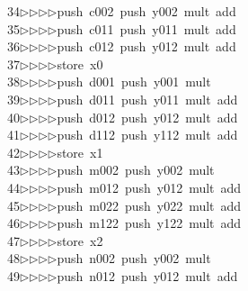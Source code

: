 \begin{tabbing}
34\>$\triangleright$\>$\triangleright$\>$\triangleright$\>$\triangleright$\>push\ c002\ push\ y002\ mult\ add\ \\[0pt]
35\>$\triangleright$\>$\triangleright$\>$\triangleright$\>$\triangleright$\>push\ c011\ push\ y011\ mult\ add\ \\[0pt]
36\>$\triangleright$\>$\triangleright$\>$\triangleright$\>$\triangleright$\>push\ c012\ push\ y012\ mult\ add\ \\[0pt]
37\>$\triangleright$\>$\triangleright$\>$\triangleright$\>$\triangleright$\>store\ x0\ \\[0pt]
38\>$\triangleright$\>$\triangleright$\>$\triangleright$\>$\triangleright$\>push\ d001\ push\ y001\ mult\ \\[0pt]
39\>$\triangleright$\>$\triangleright$\>$\triangleright$\>$\triangleright$\>push\ d011\ push\ y011\ mult\ add\ \\[0pt]
40\>$\triangleright$\>$\triangleright$\>$\triangleright$\>$\triangleright$\>push\ d012\ push\ y012\ mult\ add\ \\[0pt]
41\>$\triangleright$\>$\triangleright$\>$\triangleright$\>$\triangleright$\>push\ d112\ push\ y112\ mult\ add\ \\[0pt]
42\>$\triangleright$\>$\triangleright$\>$\triangleright$\>$\triangleright$\>store\ x1\ \\[0pt]
43\>$\triangleright$\>$\triangleright$\>$\triangleright$\>$\triangleright$\>push\ m002\ push\ y002\ mult\ \\[0pt]
44\>$\triangleright$\>$\triangleright$\>$\triangleright$\>$\triangleright$\>push\ m012\ push\ y012\ mult\ add\ \\[0pt]
45\>$\triangleright$\>$\triangleright$\>$\triangleright$\>$\triangleright$\>push\ m022\ push\ y022\ mult\ add\ \\[0pt]
46\>$\triangleright$\>$\triangleright$\>$\triangleright$\>$\triangleright$\>push\ m122\ push\ y122\ mult\ add\ \\[0pt]
47\>$\triangleright$\>$\triangleright$\>$\triangleright$\>$\triangleright$\>store\ x2\ \\[0pt]
48\>$\triangleright$\>$\triangleright$\>$\triangleright$\>$\triangleright$\>push\ n002\ push\ y002\ mult\ \\[0pt]
49\>$\triangleright$\>$\triangleright$\>$\triangleright$\>$\triangleright$\>push\ n012\ push\ y012\ mult\ add\ \\[0pt]

\end{tabbing}
